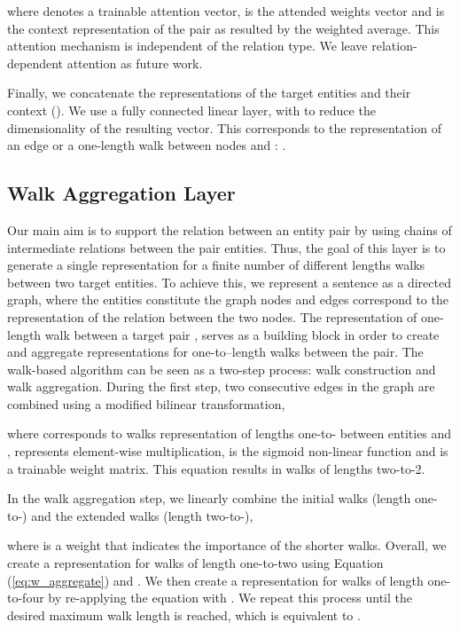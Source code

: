 \documentclass[11pt,a4paper]{article}
\begin{document}
	where  denotes a trainable attention vector, 
	 is the attended weights vector
	and
	 is the context representation of the pair as resulted by the weighted average.
    This attention mechanism is independent of the relation type. We leave relation-dependent attention as future work.
	
    Finally, we concatenate the representations of the target entities and their context (). We use a fully connected linear layer,  with  to reduce the dimensionality of the resulting vector. 
    This corresponds to the representation of an edge or a one-length walk between nodes  and :
	. 
	
\subsection{Walk Aggregation Layer}
    
    Our main aim is to support the relation between an entity pair by using chains of intermediate relations between the pair entities.
    Thus, the goal of this layer is to generate a single representation for a finite number of different lengths walks between two target entities.
	To achieve this, we represent a sentence as a directed graph, where the entities constitute the graph nodes and edges correspond to the representation of the relation between the two nodes. 
	The representation of one-length walk between a target pair , serves as a building block in order to create and aggregate representations for one-to--length walks between the pair. 
	The walk-based algorithm can be seen as a two-step process: walk construction and walk aggregation.
	During the first step, two consecutive edges in the graph are combined using a modified bilinear transformation, 
	
	where  corresponds to walks representation of lengths one-to- between entities  and ,
     represents element-wise multiplication,
	 is the sigmoid non-linear function and 
	 is a trainable weight matrix. 
    This equation results in walks of lengths two-to-2.
	
	In the walk aggregation step, we linearly combine the initial walks (length one-to-) and the extended walks (length two-to-),
	
	where 
	 is a weight that indicates the importance of the shorter walks.
    Overall, we create a representation for walks of length one-to-two using Equation (\ref{eq:w_aggregate}) and . We then create a representation for walks of length one-to-four by re-applying the equation with .   
	We repeat this process until the desired maximum walk length is reached, which is equivalent to .
    
\end{document}
